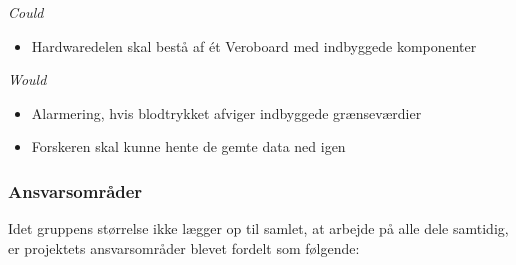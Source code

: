\textit{Could}
\begin{itemize}
\item Hardwaredelen skal bestå af ét Veroboard med indbyggede komponenter

\end{itemize} 
\textit{Would} \\[-1ex]
\begin{itemize}
\item Alarmering, hvis blodtrykket afviger indbyggede grænseværdier
\item Forskeren skal kunne hente de gemte data ned igen
\end{itemize}

\subsubsection{Ansvarsområder}

Idet gruppens størrelse ikke lægger op til samlet, at arbejde på alle dele samtidig, er projektets ansvarsområder blevet fordelt som følgende:

